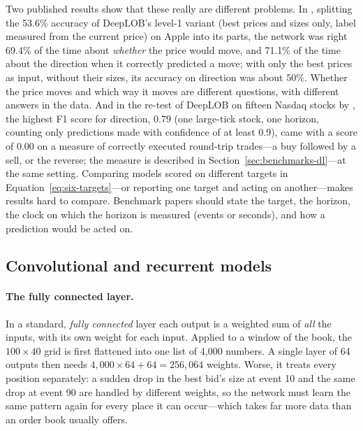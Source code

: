 Two published results show that these really are different problems. In \citet{lee2024predictability}, splitting
the 53.6\% accuracy of DeepLOB's level-1 variant (best prices and sizes only, label measured from the current price)
on Apple into its parts, the network was right 69.4\% of the time about \emph{whether}
the price would move, and 71.1\% of the time about the direction when it correctly predicted a move; with only the
best prices as input, without their sizes, its accuracy on direction was about 50\%. Whether the price moves and which way it moves
are different questions, with different answers in the data. And in the re-test of DeepLOB on fifteen Nasdaq stocks
by \citet{briola2024}, the highest F1 score for direction, 0.79 (one large-tick stock, one horizon, counting only predictions made
with confidence of at least 0.9), came with a score of 0.00
on a measure of correctly executed round-trip trades---a buy followed by a sell, or the reverse; the measure is
described in Section~\ref{sec:benchmarks-dl}---at the same setting. Comparing models scored on different targets in
Equation~\eqref{eq:six-targets}---or reporting one target and acting on another---makes results hard to compare. Benchmark papers should state the target, the horizon, the clock on which the horizon is measured
(events or seconds), and how a prediction would be acted on.

\subsection{Convolutional and recurrent models}
\label{sec:deep-cnn}

\paragraph{The fully connected layer.} In a standard, \emph{fully connected} layer each
output is a weighted sum of \emph{all} the inputs, with its own weight for each input. Applied to a window of the
book, the $100 \times 40$ grid is first flattened into one list of 4,000 numbers. A single layer of 64 outputs then
needs $4{,}000 \times 64 + 64 = 256{,}064$ weights. Worse, it treats every position separately: a sudden drop in the
best bid's size at event 10 and the same drop at event 90 are handled by different weights, so the network must learn
the same pattern again for every place it can occur---which takes far more data than an order book usually offers.

